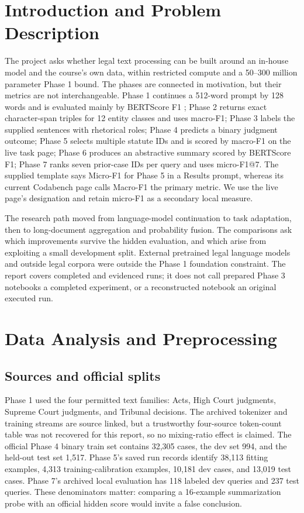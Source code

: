 \documentclass[11pt,oneside]{article}
\begin{document}
\section{Introduction and Problem Description}
The project asks whether legal text processing can be built around an in-house model and the course's own data, within restricted compute and a 50--300 million parameter Phase 1 bound. The phases are connected in motivation, but their metrics are not interchangeable. Phase 1 continues a 512-word prompt by 128 words and is evaluated mainly by BERTScore F1 \cite{zhang2020bertscore}; Phase 2 returns exact character-span triples for 12 entity classes and uses macro-F1; Phase 3 labels the supplied sentences with rhetorical roles; Phase 4 predicts a binary judgment outcome; Phase 5 selects multiple statute IDs and is scored by macro-F1 on the live task page; Phase 6 produces an abstractive summary scored by BERTScore F1; Phase 7 ranks seven prior-case IDs per query and uses micro-F1@7. The supplied template says Micro-F1 for Phase 5 in a Results prompt, whereas its current Codabench page calls Macro-F1 the primary metric. We use the live page's designation and retain micro-F1 as a secondary local measure.

The research path moved from language-model continuation to task adaptation, then to long-document aggregation and probability fusion. The comparisons ask which improvements survive the hidden evaluation, and which arise from exploiting a small development split. External pretrained legal language models and outside legal corpora were outside the Phase 1 foundation constraint. The report covers completed and evidenced runs; it does not call prepared Phase 3 notebooks a completed experiment, or a reconstructed notebook an original executed run.

\section{Data Analysis and Preprocessing}
\subsection{Sources and official splits}
Phase 1 used the four permitted text families: Acts, High Court judgments, Supreme Court judgments, and Tribunal decisions. The archived tokenizer and training streams are source linked, but a trustworthy four-source token-count table was not recovered for this report, so no mixing-ratio effect is claimed. The official Phase 4 binary train set contains 32,305 cases, the dev set 994, and the held-out test set 1,517. Phase 5's saved run records identify 38,113 fitting examples, 4,313 training-calibration examples, 10,181 dev cases, and 13,019 test cases. Phase 7's archived local evaluation has 118 labeled dev queries and 237 test queries. These denominators matter: comparing a 16-example summarization probe with an official hidden score would invite a false conclusion.
\end{document}
